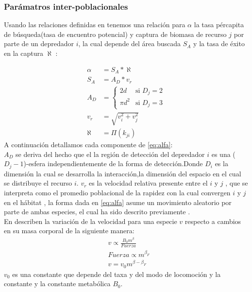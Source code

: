 \subsubsection{Par\'amatros inter-poblacionales}
Usando las relaciones definidas en \citep{pawar2012dimensionality,kiltie2000scaling,mcgill2006allometric,bejan2006unifying} tenemos una relaci\'on para $\alpha$  la tasa p\'ercapita de b\'usqueda(tasa de encuentro potencial) y captura de biomasa de recurso $j$ por parte de un depredador $i$, la cual depende del \'area buscada $S_A$ y la tasa de \'exito en la captura $\aleph$ :  

\begin{equation}\label{eq:alfa}
\begin{aligned}
 \alpha & =  S_A*\aleph \\
 S_A &=  A_D * v_r \\
A_D &=  \begin{cases} 2d & \text{si } D_j = 2 \\ \pi d^2 & \text{si } D_j = 3 \end{cases}\\
v_r &= \sqrt{v_i^2 +v_j^2}\\
\aleph &= \Pi(k_{ji})
\end{aligned}
\end{equation}
A continuaci\'on detallamos cada componente de \eqref{eq:alfa}:\\

$A_D$ se deriva del hecho que el la regi\'on de detecci\'on del depredador $i$ es una ($D_j-1$)-esfera independientemente de la forma de detecci\'on\citep{pawar2012dimensionality}.Donde $D_i$ es la dimensi\'on la cual se desarrolla la interacci\'on,la dimensi\'on del espacio en el cual se distribuye el recurso $i$.
$v_r$ es la velocidad relativa presente entre el $i$ y $j$ , que se interpreta como el promedio poblacional de la rapidez con la cual convergen $i$ y $j$ en el h\'abitat \citep[supinfo.]{pawar2012dimensionality} , la forma dada en \eqref{eq:alfa} asume un movimiento aleatorio por parte de ambas especies, el cual ha sido descrito previamente \citep{okubo2001diffusion}.\\
En \cite{pawar2012dimensionality} describen la variaci\'on de la velocidad para una especie $v$ respecto a cambios en su masa corporal de la siguiente manera:
\begin{equation}\label{eq:vel}
\begin{aligned}
&v \propto \frac{B_0 m^\beta}{Fuerza}\\
&Fuerza \propto m^{\beta_F} \\
&v = v_0m^{\beta - \beta_F}
\end{aligned}
\end{equation}
$v_0$ es una constante que depende del taxa y del modo de locomoci\'on y la constante y la constante metab\'olica $B_0$.\\ 

